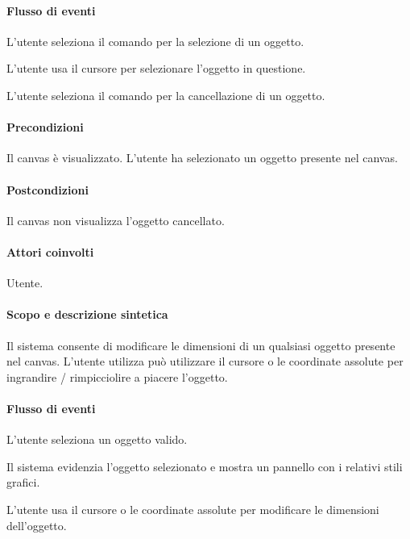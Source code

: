 \paragraph{Flusso di eventi}
\begin{elenconumerato}[\textbf{}]{\subsubsecindent}
\item  L'utente seleziona il comando per la selezione di un oggetto.
\item  L'utente usa il cursore per selezionare l'oggetto in questione.
\item  L'utente seleziona il comando per la cancellazione di un oggetto.
\end{elenconumerato}
\paragraph{Precondizioni} Il canvas \`e visualizzato. L'utente ha selezionato un oggetto presente nel canvas.
\paragraph{Postcondizioni} Il canvas non visualizza l'oggetto cancellato.

\paragraph{Attori coinvolti} Utente.
\paragraph{Scopo e descrizione sintetica}  Il sistema consente di modificare le dimensioni  di un qualsiasi oggetto presente nel canvas.  L'utente utilizza pu\`o utilizzare il cursore o le coordinate assolute per ingrandire / rimpicciolire a piacere l'oggetto.
\paragraph{Flusso di eventi}
\begin{elenconumerato}[\textbf{}]{\subsubsecindent}
\item  L'utente seleziona un oggetto valido.
\item  Il sistema evidenzia l'oggetto selezionato e mostra un pannello con i relativi stili grafici.
\item  L'utente usa il cursore o le coordinate assolute per modificare le dimensioni dell'oggetto.
\end{elenconumerato}
